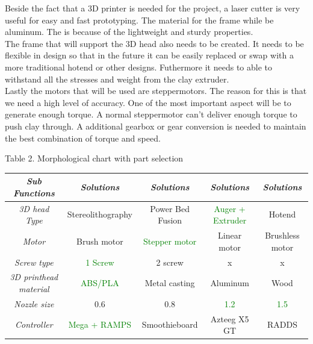 \documentclass[11pt]{article}
\begin{document}
 Beside the fact that a 3D printer is needed for the project, a laser cutter is very useful for easy and fast prototyping. The material for the frame while be aluminum. The is because of the lightweight and sturdy properties. \\
 
 The frame that will support the 3D head also needs to be created. It needs to be flexible in design so that in the future it can be easily replaced or swap with a more traditional hotend or other designs. Futhermore it needs to able to withstand all the stresses and weight from the clay extruder.\\
 
 Lastly the motors that will be used are steppermotors. The reason for this is that we need a high level of accuracy. One of the most important aspect will be to generate enough torque. A normal steppermotor can't deliver enough torque to push clay through. A additional gearbox or gear conversion is needed to maintain the best combination of torque and speed. 

 	\begin{center}
Table 2. Morphological chart with part selection
\end{center}
 \begin{center}
 \begin{tabular}{|| c || c | c | c | c ||}
 
 \hline\hline
    \textit{Sub Functions} & \textit{Solutions} & \textit{Solutions}  & \textit{Solutions} & \textit{Solutions}   \\ [1.5ex]  
  \hline\hline
   
   \textit{3D head Type} & Stereolithography & Power Bed Fusion & \textcolor{green}{ Auger + Extruder} &  Hotend    \\
   \hline
    \textit{Motor} & Brush motor & \textcolor{green}{Stepper motor} & Linear motor & Brushless motor   \\
   \hline

 	\textit{Screw type} & \textcolor{green}{1 Screw} &  2 screw & x & x  \\
   \hline   
   	\textit{3D printhead material}   & \textcolor{green}{ ABS/PLA }& Metal casting & Aluminum & Wood     \\
   	\hline
   	\textit{Nozzle size}  & 0.6  & 0.8 & \textcolor{green}{ 1.2}  &\textcolor{green}{ 1.5 }  \\
   	\hline 
   	\textit{Controller}  & \textcolor{green}{ Mega + RAMPS } & Smoothieboard & Azteeg X5 GT  & RADDS   \\
   	\hline\hline 
   
   
 \end{tabular}
\end{center}  
\end{document}
